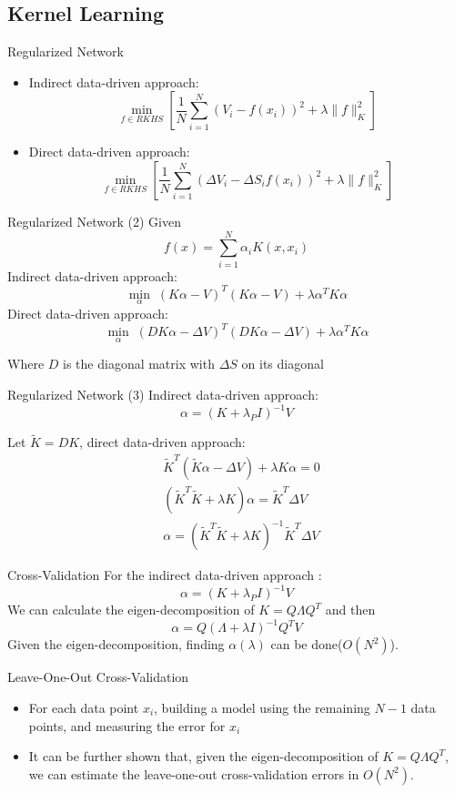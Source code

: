 \documentclass[10pt,table,mathserif]{beamer}
\begin{document}
\subsection{Kernel Learning}
\begin{frame}{Regularized Network}
\begin{itemize}
  \item Indirect data-driven approach:
\[
\min_{f \in RKHS}\left[\frac{1}{N} \sum_{i=1}^N(V_i- f(x_i))^2+\lambda\|f\|^2_K\right]
\]
  \item Direct data-driven approach:
\[
\min_{f \in RKHS}\left[\frac{1}{N} \sum_{i=1}^N(\Delta V_i-\Delta S_i f(x_i))^2+\lambda\|f\|^2_K \right]
\]
\end{itemize}
\end{frame}
\begin{frame}{Regularized Network (2)}
Given
\[
f(x)=\sum_{i=1}^N \alpha_iK(x,x_i)
\]
Indirect data-driven approach:
\[
\min_{\alpha} \; ( K \alpha - V)^T ( K \alpha -V)+ \lambda \alpha^TK\alpha
\]
Direct data-driven approach:
\[
\min_{\alpha} \;( D K \alpha - \Delta V)^T ( D K \alpha -\Delta V)+ \lambda \alpha^T K \alpha
\]

Where $D$ is the diagonal matrix with $\Delta S$ on its diagonal
\end{frame}


\begin{frame}{Regularized Network (3)}
Indirect data-driven approach:
\[
\alpha  =(K+\lambda_P I)^{-1}V
\]

Let $\widetilde{K}=D K$, direct data-driven approach:
\[\begin{split}
&\widetilde{K}^T(\widetilde{K} \alpha -\Delta V)+ \lambda K \alpha =0\\
&(\widetilde{K}^T\widetilde{K}  + \lambda K)\alpha = \widetilde{K}^T \Delta V\\
&\alpha = (\widetilde{K}^T\widetilde{K}  + \lambda K)^{-1} \widetilde{K}^T \Delta V
  \end{split}
\]
\end{frame}

\begin{frame}{Cross-Validation }
For the indirect data-driven approach :
\[
\alpha  =(K+\lambda_P I)^{-1}V
\]
We can calculate the eigen-decomposition of $K=Q \Lambda Q^T$ and then
\[
\alpha  =Q(\Lambda + \lambda I)^{-1} Q^TV
\]
Given the eigen-decomposition, finding $\alpha(\lambda)$  can be done($O(N^2)$).
\end{frame}


\begin{frame}{Leave-One-Out Cross-Validation }
\begin{itemize}
  \item For each data point $x_i$, building a model using the remaining $N-1$ data points, and measuring the error for $x_i$
  \item It can be further shown that, given the eigen-decomposition of $K=Q \Lambda Q^T$, we can estimate the leave-one-out cross-validation errors in $O(N^2)$.
\end{itemize}

\end{frame}
\end{document}
